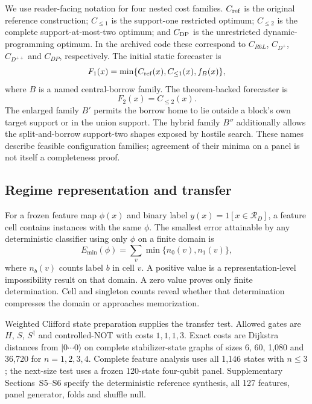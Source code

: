 We use reader-facing notation for four nested cost families.  $C_{\rm ref}$ is the original reference construction; $C_{\le1}$ is the support-one restricted optimum; $C_{\le2}$ is the complete support-at-most-two optimum; and $C_{\rm DP}$ is the unrestricted dynamic-programming optimum.  In the archived code these correspond to $C_{R6L}$, $C_{D^+}$, $C_{D^{++}}$ and $C_{DP}$, respectively.  The initial static forecaster is
\begin{equation}
 F_1(x)=\min\{C_{\rm ref}(x),C_{\le1}(x),f_B(x)\},
 \label{eq:f1}
\end{equation}
where $B$ is a named central-borrow family.  The theorem-backed forecaster is
\begin{equation}
 F_2(x)=C_{\le2}(x).
 \label{eq:f2}
\end{equation}
The enlarged family $B'$ permits the borrow home to lie outside a block's own target support or in the union support.  The hybrid family $B''$ additionally allows the split-and-borrow support-two shapes exposed by hostile search.  These names describe feasible configuration families; agreement of their minima on a panel is not itself a completeness proof.

\subsection{Regime representation and transfer}

For a frozen feature map $\phi(x)$ and binary label $y(x)=1[x\in\mathcal R_D]$, a feature cell contains instances with the same $\phi$.  The smallest error attainable by any deterministic classifier using only $\phi$ on a finite domain is
\begin{equation}
 E_{\min}(\phi)=\sum_v\min\{n_0(v),n_1(v)\},
 \label{eq:emin}
\end{equation}
where $n_b(v)$ counts label $b$ in cell $v$.  A positive value is a representation-level impossibility result on that domain.  A zero value proves only finite determination.  Cell and singleton counts reveal whether that determination compresses the domain or approaches memorization.

Weighted Clifford state preparation supplies the transfer test.  Allowed gates are $H$, $S$, $S^\dagger$ and controlled-NOT with costs $1,1,1,3$.  Exact costs are Dijkstra distances from $|0\cdots0\rangle$ on complete stabilizer-state graphs of sizes 6, 60, 1,080 and 36,720 for $n=1,2,3,4$.  Complete feature analysis uses all 1,146 states with $n\le3$; the next-size test uses a frozen 120-state four-qubit panel.  Supplementary Sections~S5--S6 specify the deterministic reference synthesis, all 127 features, panel generator, folds and shuffle null.

